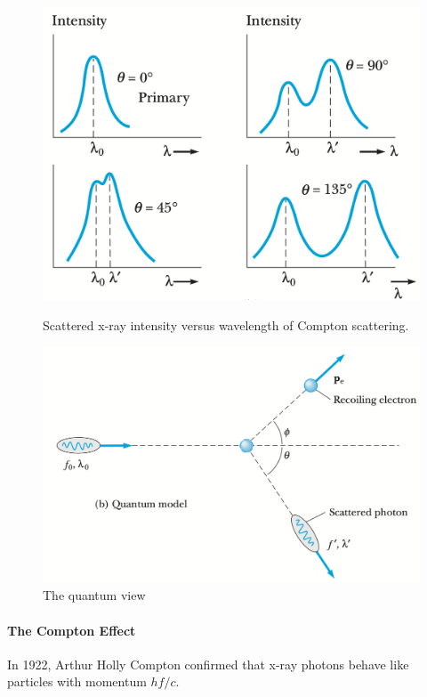     \begin{figure}
        \includegraphics[width=0.9\linewidth]{figures/compton effect.png}
        \caption{Scattered x-ray intensity versus wavelength of Compton scattering.}
        \label{fig:Scattered x-ray}
        \includegraphics[width=0.9\linewidth]{figures/particle-like collision.png}
        \caption{The quantum view}
        \label{fig:scattered quantum x-ray}
    \end{figure}

    \paragraph{The Compton Effect} %
    \label{par:The Compton Effect}
    In 1922, Arthur Holly Compton confirmed that x-ray photons behave like particles with momentum $hf/c$.


